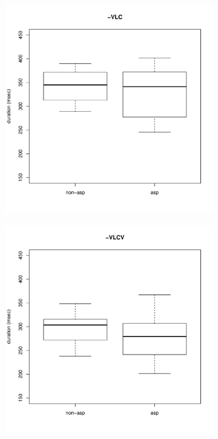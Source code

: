 \documentclass[11pt,a4paper,openany]{memoir}\usepackage[]{graphicx}\usepackage[]{color}
\newenvironment{knitrout}{}{} %
\begin{document}
\begin{figure}
\begin{subfigure}{.5\textwidth}
\begin{knitrout}
\end{knitrout}
\end{subfigure}
\begin{subfigure}{.5\textwidth}
\centering
\begin{knitrout}
\color{fgcolor}
\includegraphics[width=\textwidth]{img/mono-lat-vor-1} 

\end{knitrout}
\end{subfigure}
\begin{subfigure}{.5\textwidth}
\centering
\begin{knitrout}
\color{fgcolor}
\includegraphics[width=\textwidth]{img/di-lat-vor-1} 


\end{knitrout}
\end{subfigure}
\end{figure}
\end{document}
